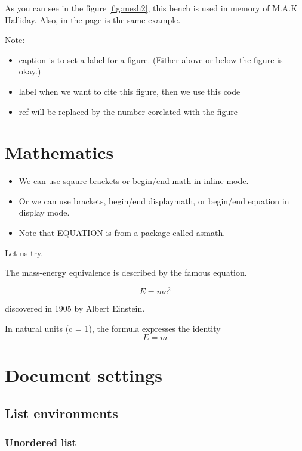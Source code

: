 \documentclass[12pt, letterpaper]{article}
\begin{document}
\begin{spacing}{1.3}
As you can see in the figure \ref{fig:mesh2}, this bench is used in memory of M.A.K Halliday. Also, in the page \pageref{fig:mesh1} is the same example.

Note:
\begin{itemize}
    \item caption{} is to set a label for a figure. (Either above or below the figure is okay.)
    \item label{} when we want to cite this figure, then we use this code
    \item ref{} will be replaced by the number corelated with the figure
\end{itemize}


\section{Mathematics}
\begin{itemize}
    \item We can use sqaure brackets or begin/end math in inline mode.
    \item Or we can use brackets, begin/end displaymath, or begin/end equation in display mode.
    \item Note that EQUATION is from a package called asmath.
\end{itemize}
Let us try.

The mass-energy equivalence is described by the famous equation.

\[E=mc^2 \]

discovered in 1905 by Albert Einstein.

In natural units (c = 1), the formula expresses the identity
\begin{equation}
E=m
\end{equation}

\section{Document settings}
\subsection{List environments}

\subsubsection{Unordered list}


\end{spacing}
\end{document}
